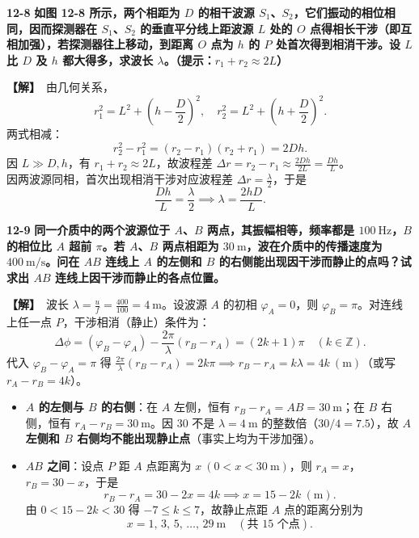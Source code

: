 \documentclass[zihao=5,a4paper,UTF8]{ctexart}
\newenvironment{prob}[2]{%
    \par\vspace{6pt}\noindent\textbf{\color{navy}#1} \textbf{#2}\par\nopagebreak\vspace{2pt}%
}{%
    \par\vspace{4pt}%
}
\newcommand{\sol}{\noindent\textbf{\color{tealaccent}【解】}\ }
\begin{document}
\begin{prob}{12-8}{如图 12-8 所示，两个相距为 $D$ 的相干波源 $S_1$、$S_2$，它们振动的相位相同，因而探测器在 $S_1$、$S_2$ 的垂直平分线上距波源 $L$ 处的 $O$ 点得相长干涉（即互相加强），若探测器往上移动，到距离 $O$ 点为 $h$ 的 $P$ 处首次得到相消干涉。设 $L$ 比 $D$ 及 $h$ 都大得多，求波长 $\lambda$。（提示：$r_1+r_2 \approx 2L$）}
\sol 由几何关系，
\[
    r_1^2 = L^2 + \left(h - \frac{D}{2}\right)^2,\quad r_2^2 = L^2 + \left(h + \frac{D}{2}\right)^2.
\]
两式相减：
\[
    r_2^2 - r_1^2 = (r_2 - r_1)(r_2 + r_1) = 2Dh.
\]
因 $L \gg D, h$，有 $r_1 + r_2 \approx 2L$，故波程差 $\Delta r = r_2 - r_1 \approx \frac{2Dh}{2L} = \frac{Dh}{L}$。\\
因两波源同相，首次出现相消干涉对应波程差 $\Delta r = \frac{\lambda}{2}$，于是
\[
    \frac{Dh}{L} = \frac{\lambda}{2} \implies \lambda = \frac{2hD}{L}.
\]
\end{prob}

\begin{prob}{12-9}{同一介质中的两个波源位于 $A$、$B$ 两点，其振幅相等，频率都是 $100\ \mathrm{Hz}$，$B$ 的相位比 $A$ 超前 $\pi$。若 $A$、$B$ 两点相距为 $30\ \mathrm{m}$，波在介质中的传播速度为 $400\ \mathrm{m/s}$。问在 $AB$ 连线上 $A$ 的左侧和 $B$ 的右侧能出现因干涉而静止的点吗？试求出 $AB$ 连线上因干涉而静止的各点位置。}
\sol 波长 $\lambda = \frac{u}{f} = \frac{400}{100} = 4\ \mathrm{m}$。设波源 $A$ 的初相 $\varphi_A = 0$，则 $\varphi_B = \pi$。对连线上任一点 $P$，干涉相消（静止）条件为：
\[
    \Delta\phi = (\varphi_B - \varphi_A) - \frac{2\pi}{\lambda}(r_B - r_A) = (2k+1)\pi\quad (k \in \mathbb{Z}).
\]
代入 $\varphi_B - \varphi_A = \pi$ 得 $\frac{2\pi}{\lambda}(r_B - r_A) = 2k\pi \implies r_B - r_A = k\lambda = 4k\ (\mathrm{m})$（或写 $r_A - r_B = 4k$）。
\begin{itemize}[leftmargin=1.5em, itemsep=2pt]
    \item \textbf{$A$ 的左侧与 $B$ 的右侧}：在 $A$ 左侧，恒有 $r_B - r_A = AB = 30\ \mathrm{m}$；在 $B$ 右侧，恒有 $r_A - r_B = 30\ \mathrm{m}$。因 $30$ 不是 $\lambda = 4\ \mathrm{m}$ 的整数倍（$30/4 = 7.5$），故 \textbf{$A$ 左侧和 $B$ 右侧均不能出现静止点}（事实上均为干涉加强）。
    \item \textbf{$AB$ 之间}：设点 $P$ 距 $A$ 点距离为 $x\ (0 < x < 30\ \mathrm{m})$，则 $r_A = x$，$r_B = 30 - x$，于是
    \[
        r_B - r_A = 30 - 2x = 4k \implies x = 15 - 2k\ (\mathrm{m}).
    \]
    由 $0 < 15 - 2k < 30$ 得 $-7 \le k \le 7$，故静止点距 $A$ 点的距离分别为
    \[
        x = 1,\, 3,\, 5,\, \dots,\, 29\ \mathrm{m}\quad (\text{共 } 15\text{ 个点}).
    \]
\end{itemize}
\end{prob}
\end{document}
